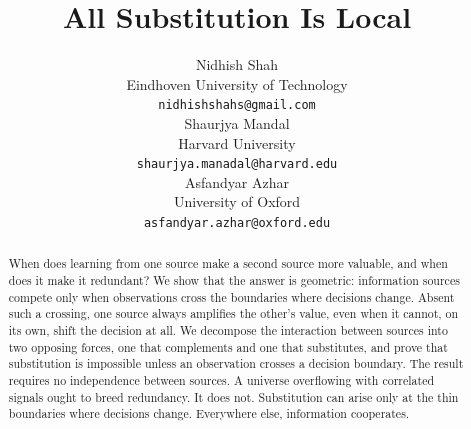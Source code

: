 \documentclass{article}
\title{All Substitution Is Local}
\author{
    Nidhish Shah \\
    Eindhoven University of Technology \\
    \texttt{nidhishshahs@gmail.com} \\
\And
    Shaurjya Mandal \\
    Harvard University \\
    \texttt{shaurjya.manadal@harvard.edu} \\
\And
    Asfandyar Azhar \\
    University of Oxford \\
    \texttt{asfandyar.azhar@oxford.edu} \\
}
\begin{document}
\maketitle

\begin{abstract}
When does learning from one source make a second source more valuable, and when does it make it redundant? We show that the answer is geometric: information sources compete only when observations cross the boundaries where decisions change. Absent such a crossing, one source always amplifies the other's value, even when it cannot, on its own, shift the decision at all. We decompose the interaction between sources into two opposing forces, one that complements and one that substitutes, and prove that substitution is impossible unless an observation crosses a decision boundary. The result requires no independence between sources. A universe overflowing with correlated signals ought to breed redundancy. It does not. Substitution can arise only at the thin boundaries where decisions change. Everywhere else, information cooperates.
\end{abstract}












\clearpage

\end{document}
